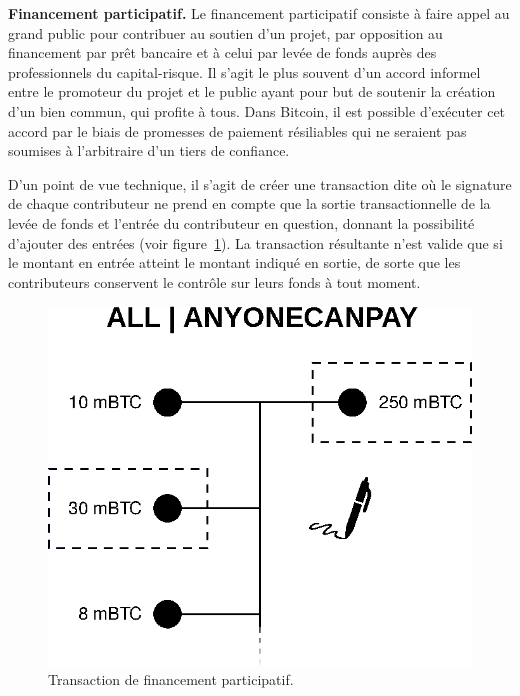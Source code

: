 
\textbf{Financement participatif.} Le financement participatif consiste à faire appel au grand public pour contribuer au soutien d'un projet, par opposition au financement par prêt bancaire et à celui par levée de fonds auprès des professionnels du capital-risque. Il s'agit le plus souvent d'un accord informel entre le promoteur du projet et le public ayant pour but de soutenir la création d'un bien commun, qui profite à tous. Dans Bitcoin, il est possible d'exécuter cet accord par le biais de promesses de paiement résiliables qui ne seraient pas soumises à l'arbitraire d'un tiers de confiance.

D'un point de vue technique, il s'agit de créer une transaction dite  où le signature de chaque contributeur ne prend en compte que la sortie transactionnelle de la levée de fonds et l'entrée du contributeur en question, donnant la possibilité d'ajouter des entrées (voir figure~\ref{fig:sighash-anyonecanpay}). La transaction résultante n'est valide que si le montant en entrée atteint le montant indiqué en sortie, de sorte que les contributeurs conservent le contrôle sur leurs fonds à tout moment.

\begin{figure}[ht]
  \centering
  \includegraphics[scale=0.65]{img/sighash-anyonecanpay.eps}
  \caption{Transaction de financement participatif.}
  \label{fig:sighash-anyonecanpay}
\end{figure}

